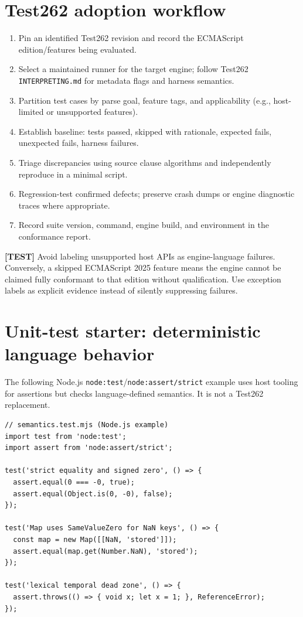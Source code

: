 \documentclass[11pt,letterpaper]{article}
\providecommand{\tightlist}{\setlength{\itemsep}{0pt}\setlength{\parskip}{0pt}}
\newcommand{\passthrough}[1]{#1}
\begin{document}
\section{Test262 adoption workflow}\label{test262-adoption-workflow}

\begin{enumerate}
\def\labelenumi{\arabic{enumi}.}
\tightlist
\item
  Pin an identified Test262 revision and record the ECMAScript edition/features being evaluated.
\item
  Select a maintained runner for the target engine; follow Test262 \passthrough{\lstinline!INTERPRETING.md!} for metadata flags and harness semantics.
\item
  Partition test cases by parse goal, feature tags, and applicability (e.g., host-limited or unsupported features).
\item
  Establish baseline: tests passed, skipped with rationale, expected fails, unexpected fails, harness failures.
\item
  Triage discrepancies using source clause algorithms and independently reproduce in a minimal script.
\item
  Regression-test confirmed defects; preserve crash dumps or engine diagnostic traces where appropriate.
\item
  Record suite version, command, engine build, and environment in the conformance report.
\end{enumerate}

\textbf{{[}TEST{]}} Avoid labeling unsupported host APIs as engine-language failures. Conversely, a skipped ECMAScript 2025 feature means the engine cannot be claimed fully conformant to that edition without qualification. Use exception labels as explicit evidence instead of silently suppressing failures.

\section{Unit-test starter: deterministic language behavior}\label{unit-test-starter-deterministic-language-behavior}

The following Node.js \passthrough{\lstinline!node:test!}/\passthrough{\lstinline!node:assert/strict!} example uses host tooling for assertions but checks language-defined semantics. It is not a Test262 replacement.

\begin{lstlisting}
// semantics.test.mjs (Node.js example)
import test from 'node:test';
import assert from 'node:assert/strict';

test('strict equality and signed zero', () => {
  assert.equal(0 === -0, true);
  assert.equal(Object.is(0, -0), false);
});

test('Map uses SameValueZero for NaN keys', () => {
  const map = new Map([[NaN, 'stored']]);
  assert.equal(map.get(Number.NaN), 'stored');
});

test('lexical temporal dead zone', () => {
  assert.throws(() => { void x; let x = 1; }, ReferenceError);
});
\end{lstlisting}
\end{document}
